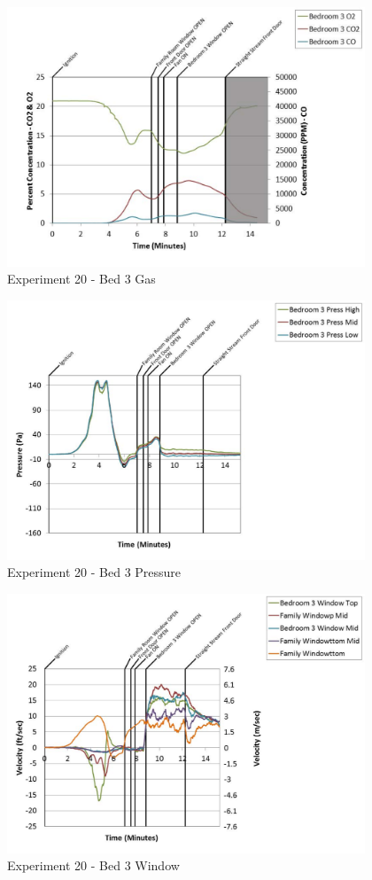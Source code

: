 \documentclass{article}
\begin{document}
\begin{appendices}
	\clearpage

	\begin{figure}[h!]
		\centering
		\includegraphics[height=3.05in]{0_Images/Results_Charts/Exp_20_Charts/Bed3Gas.pdf}
		\caption{Experiment 20 - Bed 3 Gas}
	\end{figure}
 

	\begin{figure}[h!]
		\centering
		\includegraphics[height=3.05in]{0_Images/Results_Charts/Exp_20_Charts/Bed3Pressure.pdf}
		\caption{Experiment 20 - Bed 3 Pressure}
	\end{figure}
 
	\clearpage

	\begin{figure}[h!]
		\centering
		\includegraphics[height=3.05in]{0_Images/Results_Charts/Exp_20_Charts/Bed3Window.pdf}
		\caption{Experiment 20 - Bed 3 Window}
	\end{figure}
 


\end{appendices}
\end{document}
